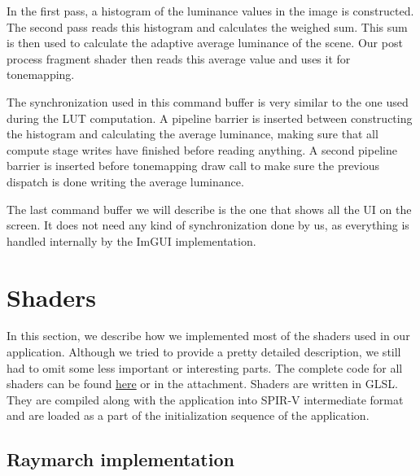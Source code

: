 \documentclass{ctuthesis}
\begin{document}
In the first pass, a histogram of the luminance values in the image is constructed. The second pass reads
this histogram and calculates the weighed sum. This sum is then used to calculate the adaptive average
luminance of the scene. Our post process fragment shader then reads this average value and uses it 
for tonemapping.

The synchronization used in this command buffer is very similar to the one used during the LUT computation.
A pipeline barrier is inserted between constructing the histogram and calculating the 
average luminance, making sure that all compute stage writes have finished before reading anything.
A second pipeline barrier is inserted before tonemapping draw call to make sure the previous 
dispatch is done writing the average luminance. 

The last command buffer we will describe is the one that shows all the UI on the screen. It does not need
any kind of synchronization done by us, as everything is handled internally by the ImGUI 
implementation.

\section{Shaders}

In this section, we describe how we implemented most of the shaders used in our application. Although
we tried to provide a pretty detailed description, we still had to omit some less important or
interesting parts. The complete code for all shaders can be found 
\href{https://github.com/MatejSakmary/RenderingAtmospheres/tree/main/ProductionReadyAtmospheresVulkan/shaders}{here} or in the attachment.
Shaders are written in GLSL. They are compiled along with the application into SPIR-V 
intermediate format and are loaded as a part of the initialization sequence of the application.

\subsection{Raymarch implementation}
\end{document}
